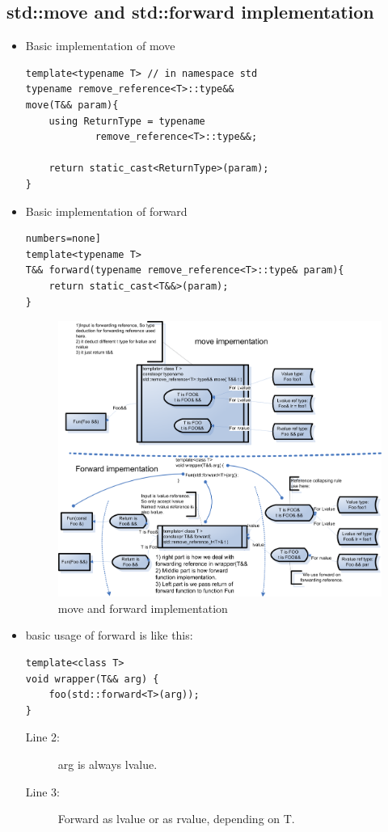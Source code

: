 \documentclass[a4paper,11pt,twoside]{book}
\begin{document}
\subsection{std::move and std::forward implementation}
\begin{itemize}
	\item Basic implementation of move
\begin{lstlisting}[numbers=none]
template<typename T> // in namespace std
typename remove_reference<T>::type&&
move(T&& param){
	using ReturnType = typename 
			remove_reference<T>::type&&; 
			
	return static_cast<ReturnType>(param);
}
\end{lstlisting}
	
	\item Basic implementation of forward
\begin{lstlisting}numbers=none]
template<typename T>
T&& forward(typename remove_reference<T>::type& param){
	return static_cast<T&&>(param);
}
\end{lstlisting}

	\begin{figure}[h]
	\centering
	\includegraphics[width=0.85\linewidth]{pics/rvalue_ref.png}
	\caption{move and forward implementation}
	\label{fig:rvalueref}
\end{figure}

	\item basic usage of forward is like this:
\begin{lstlisting}
template<class T>
void wrapper(T&& arg) {
	foo(std::forward<T>(arg)); 
}
\end{lstlisting}
\begin{description}
	\item[Line 2:] arg is always lvalue.
	\item[Line 3:] Forward as lvalue or as rvalue, depending on T.
	

\end{description}
\end{itemize}
\end{document}

